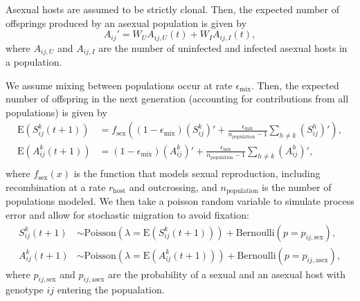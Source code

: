 \documentclass{article}\usepackage[]{graphicx}\usepackage[]{color}
\begin{document}
Asexual hosts are assumed to be strictly clonal. Then, the expected number of offsprings produced by an asexual population is given by
\begin{equation}
A_{ij}' = W_U A_{ij,U} (t) + W_I A_{ij,I} (t),
\end{equation}
where $A_{ij, U}$ and $A_{ij,I}$ are the number of uninfected and infected asexual hosts in a population.

We assume mixing between populations occur at rate $\epsilon_{\textrm{mix}}$.
Then, the expected number of offspring in the next generation (accounting for contributions from all populations) is given by
\begin{equation}
\begin{aligned}
\mathrm{E}\left(S_{ij}^k(t+1)\right) &= f_{\textrm{sex}}\left((1 - \epsilon_{\textrm{mix}}) \left(S_{ij}^k\right)' + \frac{\epsilon_{\textrm{mix}}}{n_{\textrm{population}}-1} \sum_{h \neq k} \left(S_{ij}^h\right)'\right),\\
\mathrm{E}\left(A_{ij}^k(t+1)\right) &= (1 - \epsilon_{\textrm{mix}}) \left(A_{ij}^k\right)' + \frac{\epsilon_{\textrm{mix}}}{n_{\textrm{population}}-1} \sum_{h \neq k} \left(A_{ij}^h\right)',\\
\end{aligned}
\end{equation}
where $f_{\textrm{sex}}(x)$ is the function that models sexual reproduction, including recombination at a rate $r_{\textrm{host}}$ and outcrossing, and $n_{\textrm{population}}$ is the number of populations modeled.
We then take a poisson random variable to simulate process error and allow for stochastic migration to avoid fixation:
\begin{equation}
\begin{aligned}
S_{ij}^k(t+1) &\sim \mathrm{Poisson}\left(\lambda=\mathrm{E}\left(S_{ij}^k(t+1)\right)\right) + \mathrm{Bernoulli}\left(p=p_{ij,\textrm{sex}}\right),\\
A_{ij}^k(t+1) &\sim \mathrm{Poisson}\left(\lambda=\mathrm{E}\left(A_{ij}^k(t+1)\right)\right) + \mathrm{Bernoulli}\left(p=p_{ij, \textrm{asex}}\right),
\end{aligned}
\end{equation}
where $p_{ij,\textrm{sex}}$ and $p_{ij, \textrm{asex}}$ are the probability of a sexual and an asexual host with genotype $ij$ entering the popualation.
\end{document}
